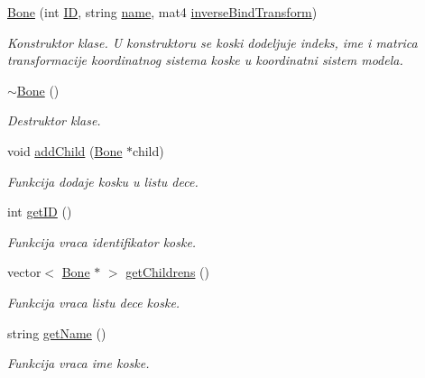 \begin{DoxyCompactItemize}
\item 
\hyperlink{classmodel_1_1Bone_ac2ed136fad04b08ececc34627053d1f0}{Bone} (int \hyperlink{classmodel_1_1Bone_a7a300f62a3d7ffdde6f31d55cdffa44e}{ID}, string \hyperlink{classmodel_1_1Bone_ad1613b072247f5310db1ad9ec9182956}{name}, mat4 \hyperlink{classmodel_1_1Bone_a4e3fe672d5a018cf9755a344c9f193ab}{inverse\+Bind\+Transform})
\begin{DoxyCompactList}\small\item\em Konstruktor klase. U konstruktoru se koski dodeljuje indeks, ime i matrica transformacije koordinatnog sistema koske u koordinatni sistem modela. \end{DoxyCompactList}\item 
\hyperlink{classmodel_1_1Bone_af53ed3cc50856152d44920ff0a9a8504}{$\sim$\+Bone} ()
\begin{DoxyCompactList}\small\item\em Destruktor klase. \end{DoxyCompactList}\item 
void \hyperlink{classmodel_1_1Bone_a7f5ae2f1ff96a250120c8c4245280fa2}{add\+Child} (\hyperlink{classmodel_1_1Bone}{Bone} $\ast$child)
\begin{DoxyCompactList}\small\item\em Funkcija dodaje kosku u listu dece. \end{DoxyCompactList}\item 
int \hyperlink{classmodel_1_1Bone_a4af3fc3d883998c6a01b76f73a228d6d}{get\+ID} ()
\begin{DoxyCompactList}\small\item\em Funkcija vraca identifikator koske. \end{DoxyCompactList}\item 
vector$<$ \hyperlink{classmodel_1_1Bone}{Bone} $\ast$ $>$ \hyperlink{classmodel_1_1Bone_a00f7c97175801fdf9ecb58e638cee673}{get\+Childrens} ()
\begin{DoxyCompactList}\small\item\em Funkcija vraca listu dece koske. \end{DoxyCompactList}\item 
string \hyperlink{classmodel_1_1Bone_ae8a8cffeae8879f3c2d572c55c8bbdbb}{get\+Name} ()
\begin{DoxyCompactList}\small\item\em Funkcija vraca ime koske. \end{DoxyCompactList}\item 

\end{DoxyCompactItemize}
